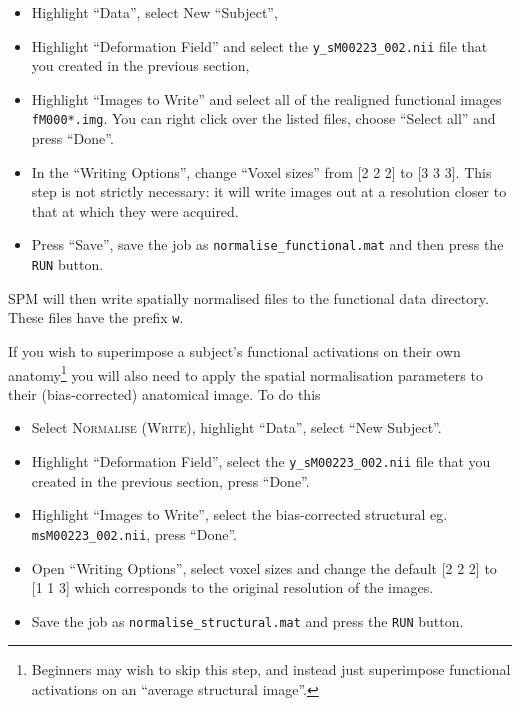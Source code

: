 \begin{itemize}
\item Highlight ``Data'', select New ``Subject'',
\item Highlight ``Deformation Field'' and select the \texttt{y\_sM00223\_002.nii} file that you created in the previous section,
\item Highlight ``Images to Write'' and select all of the realigned functional images \texttt{fM000*.img}. You can right click over the listed files, choose ``Select all'' and press ``Done''.
\item In the ``Writing Options'', change ``Voxel sizes'' from [2 2 2] to [3 3 3]. This step is not strictly necessary: it will write images out at a resolution closer to that at which they were acquired.
\item Press ``Save'', save the job as \texttt{normalise\_functional.mat} and then press the \texttt{RUN} button.
\end{itemize}

SPM will then write spatially normalised files to the functional data directory. These files have the prefix \texttt{w}.

If you wish to superimpose a subject's functional activations on their own anatomy\footnote{Beginners may wish to skip this step, and instead just superimpose functional activations on an ``average structural image''.} you will also need to apply the spatial normalisation parameters to their (bias-corrected) anatomical image. To do this

\begin{itemize}
\item Select \textsc{Normalise (Write)}, highlight ``Data'', select ``New Subject''.
\item Highlight ``Deformation Field'', select the  \texttt{y\_sM00223\_002.nii} file that you created in the previous section, press ``Done''.
\item Highlight ``Images to Write'', select the bias-corrected structural eg. \texttt{msM00223\_002.nii}, press ``Done''.
\item Open ``Writing Options'', select voxel sizes and change the default [2 2 2] to [1 1 3] which corresponds to the original resolution of the images.
\item Save the job as \texttt{normalise\_structural.mat} and press the \texttt{RUN} button.
\end{itemize}

